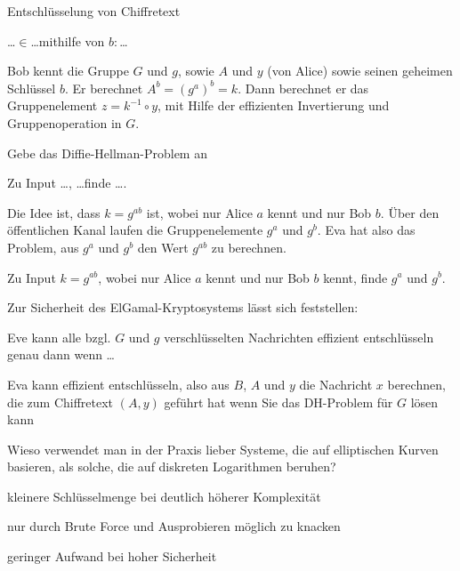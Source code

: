 \documentclass[avery5371, frame]{flashcards}
\begin{document}
\begin{flashcard}{Entschlüsselung von Chiffretext

        \dots$\in$\dots mithilfe von $b:$\dots}
    Bob kennt die Gruppe $G$ und $g$, sowie $A$ und $y$ (von Alice) sowie seinen geheimen Schlüssel $b$. Er berechnet $A^b= (g^a)^b=k$. Dann berechnet er das Gruppenelement $z=k^{-1}\circ y$, mit Hilfe der effizienten Invertierung und Gruppenoperation in $G$.
\end{flashcard}

\begin{flashcard}{Gebe das Diffie-Hellman-Problem an

        Zu Input \dots, \dots finde \dots .}
    Die Idee ist, dass $k=g^{ab}$ ist, wobei nur Alice $a$ kennt und nur Bob $b$.
    Über den öffentlichen Kanal laufen die Gruppenelemente $g^a$ und $g^b$.
    Eva hat also das Problem, aus $g^a$ und $g^b$ den Wert $g^{ab}$ zu berechnen.

    Zu Input $k=g^{ab}$, wobei nur Alice $a$ kennt und nur Bob $b$ kennt, finde $g^a$ und $g^b$.
\end{flashcard}

\begin{flashcard}{Zur Sicherheit des ElGamal-Kryptosystems lässt sich feststellen:

        Eve kann alle bzgl. $G$ und $g$ verschlüsselten Nachrichten effizient entschlüsseln genau dann wenn \dots}
    Eva kann effizient entschlüsseln, also aus $B$, $A$ und $y$ die Nachricht $x$ berechnen, die zum Chiffretext $(A,y)$ geführt hat wenn Sie das DH-Problem für $G$ lösen kann
\end{flashcard}

\begin{flashcard}{Wieso verwendet man in der Praxis lieber Systeme, die auf elliptischen Kurven basieren, als solche, die auf diskreten Logarithmen beruhen?}
    \begin{itemize*}
        \item kleinere Schlüsselmenge bei deutlich höherer Komplexität
        \item nur durch Brute Force und Ausprobieren möglich zu knacken
        \item geringer Aufwand bei hoher Sicherheit
    \end{itemize*}
\end{flashcard}
\end{document}
